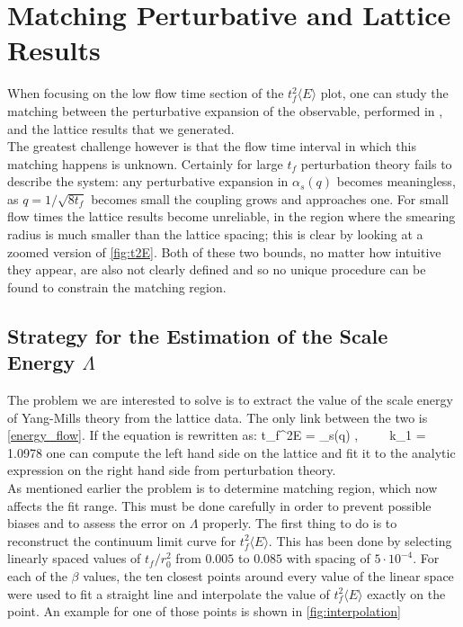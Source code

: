 \section{Matching Perturbative and Lattice Results}
When focusing on the low flow time section of the $t_f^2\langle E \rangle$ plot, one can study the matching between the perturbative expansion of the observable, performed in \cite{luscher_properties_2010}, and the lattice results that we generated. \\
The greatest challenge however is that the flow time interval in which this matching happens is unknown. Certainly for large $t_f$ perturbation theory fails to describe the system: any perturbative expansion in $\alpha_s(q)$ becomes meaningless, as $q=1/\sqrt{8t_f}$ becomes small the coupling grows and approaches one. For small flow times the lattice results become unreliable, in the region where the smearing radius is much smaller than the lattice spacing; this is clear by looking at a zoomed version of \cref{fig:t2E}. Both of these two bounds, no matter how intuitive they appear, are also not clearly defined and so no unique procedure can be found to constrain the matching region.

\subsection{Strategy for the Estimation of the Scale Energy $\Lambda$}
The problem we are interested to solve is to extract the value of the scale energy of Yang-Mills theory from the lattice data. The only link between the two is \cref{energy_flow}. If the equation is rewritten as:
\beq
t_f^2\langle E \rangle =  \alpha_s(q) ,~~~~~k_1 = 1.0978%
\label{eq:t2Ebuona}
\eeq  
one can compute the left hand side on the lattice and fit it to the analytic expression on the right hand side from perturbation theory. \\
As mentioned earlier the problem is to determine matching region, which now affects the fit range. This must be done carefully in order to prevent possible biases and to assess the error on $\Lambda$ properly. The first thing to do is to reconstruct the continuum limit curve for $t_f^2\langle E \rangle$. This has been done by selecting linearly spaced values of $t_f/r_0^2$ from $0.005$ to $0.085$ with spacing of $5\cdot 10^{-4}$. For each of the $\beta$ values, the ten closest points around every value of the linear space were used to fit a straight line and interpolate the value of  $t_f^2\langle E \rangle$ exactly on the point. An example for one of those points is shown in \cref{fig:interpolation}

